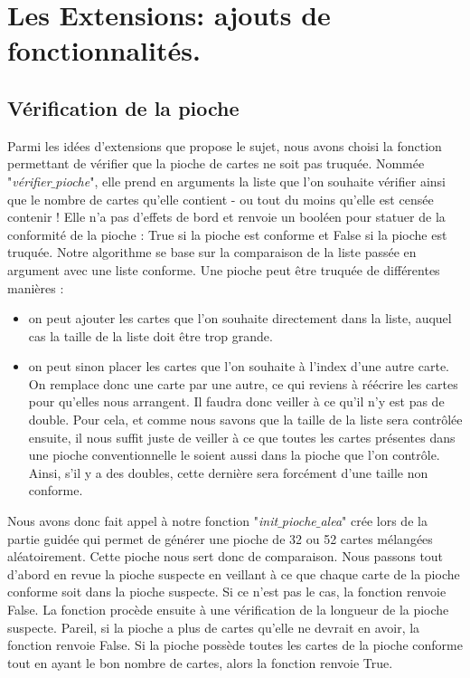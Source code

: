 \documentclass[10pt,a4paper,french,titlepage]{article}
\theoremstyle{definition}
\begin{document}
\section{Les Extensions: ajouts de fonctionnalités.}
\subsection{Vérification de la pioche}
Parmi les idées d'extensions que propose le sujet, nous avons choisi la fonction permettant de vérifier que la pioche de cartes ne soit pas truquée. Nommée "\textit{vérifier$\_$pioche}", elle prend en arguments la liste que l'on souhaite vérifier ainsi que le nombre de cartes qu'elle contient - ou tout du moins qu'elle est censée contenir ! Elle n'a pas d'effets de bord et renvoie un booléen pour statuer de la conformité de la pioche : True si la pioche est conforme et False si la pioche est truquée. Notre algorithme se base sur la comparaison de la liste passée en argument avec une liste conforme. Une pioche peut être truquée de différentes manières :
\begin{itemize}
\item on peut ajouter les cartes que l'on souhaite directement dans la liste, auquel cas la taille de la liste doit être trop grande.
\item on peut sinon placer les cartes que l'on souhaite à l'index d'une autre carte. On remplace donc une carte par une autre, ce qui reviens à réécrire les cartes pour qu'elles nous arrangent. Il faudra donc veiller à ce qu'il n'y est pas de double. Pour cela, et comme nous savons que la taille de la liste sera contrôlée ensuite, il nous suffit juste de veiller à ce que toutes les cartes présentes dans une pioche conventionnelle le soient aussi dans la pioche que l'on contrôle. Ainsi, s'il y a des doubles, cette dernière sera forcément d'une taille non conforme.
\end{itemize}

Nous avons donc fait appel à notre fonction "\textit{init$\_$pioche$\_$alea}" crée lors de la partie guidée qui permet de générer une pioche de 32 ou 52 cartes mélangées aléatoirement\label{piochealea}. Cette pioche nous sert donc de comparaison. Nous passons tout d'abord en revue la pioche suspecte en veillant à ce que chaque carte de la pioche conforme soit dans la pioche suspecte. Si ce n'est pas le cas, la fonction renvoie False. La fonction procède ensuite à une vérification de la longueur de la pioche suspecte. Pareil, si la pioche a plus de cartes qu'elle ne devrait en avoir, la fonction renvoie False. Si la pioche possède toutes les cartes de la pioche conforme tout en ayant le bon nombre de cartes, alors la fonction renvoie True.
\end{document}
